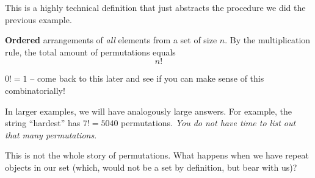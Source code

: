 \documentclass[main.tex]{subfiles}
\begin{document}
\begin{rem}
	This is a highly technical definition that just abstracts the procedure we did the previous example.
\end{rem}

\begin{defn}
	\textbf{Ordered} arrangements of \textit{all} elements from a set of size \(n\). By the multiplication rule, the total amount of permutations equals \[n!\]
\end{defn}

\begin{rem}
	\(0! = 1\) -- come back to this later and see if you can make sense of this combinatorially!
\end{rem}


\begin{rem}
	In larger examples, we will have analogously large answers. For example, the string ``hardest'' has \(7! = 5040\) permutations. \textit{You do not have time to list out that many permutations}.
\end{rem}

This is not the whole story of permutations. What happens when we have repeat objects in our set (which, would not be a set by definition, but bear with us)?
\end{document}
